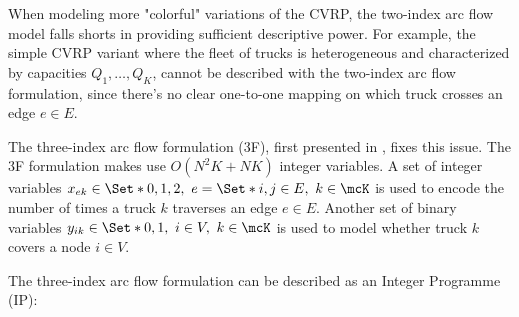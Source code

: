 When modeling more "colorful" variations of the CVRP, the two-index arc flow model falls shorts in providing sufficient descriptive power.
For example, the simple CVRP variant where the fleet of trucks is heterogeneous and characterized by capacities $Q_1, \dots, Q_K$,
cannot be described with the two-index arc flow formulation, since there's no clear one-to-one mapping on which truck crosses an edge $e \in E$.

The three-index arc flow formulation (3F), first presented in \textcite{golden1977}, fixes this issue.
The 3F formulation makes use $O(N^2 K + N K)$ integer variables.
A set of integer variables $x_{ek} \in \Set*{0, 1, 2},\ e = \Set*{i, j} \in E,\ k \in \mcK$ is used to encode the number of times a truck $k$ traverses an edge $e \in E$.
Another set of binary variables $y_{ik} \in \Set*{0, 1},\ i \in V,\ k \in \mcK$ is used to model whether truck $k$ covers a node $i \in V$.


The three-index arc flow formulation can be described as an Integer Programme (IP):


